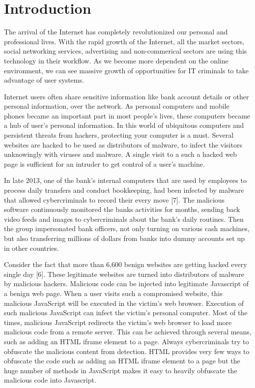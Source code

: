 \chapter{Introduction}

The arrival of the Internet has completely revolutionized our personal and professional lives. With the rapid growth of the Internet, all the market sectors, social networking services, advertising and non-commerical sectors are using this technology in their workflow. As we become more dependent on the online environment, we can see massive growth of opportunities for IT criminals to take advantage of user systems. 

Internet users often share sensitive information like bank account details or other personal information, over the network. As personal computers and mobile phones became an important part in most people's lives, these computers became a hub of user's personal information. In this world of ubiquitous computers and persistent threats from hackers, protecting your computer is a must. Several websites are hacked to be used as distributors of malware, to infect the visitors unknowingly with viruses and malware. A single visit to a such a hacked web page is sufficient for an intruder to get control of a user's machine.

In late 2013, one of the bank's internal computers that are used by employees to process daily transfers and conduct bookkeeping, had been infected by malware that allowed cybercriminals to record their every move [7]. The malicious software continuously monitored the banks activities for months, sending back video feeds and images to cybercriminals about the bank's daily routines. Then the group impersonated bank officers, not only turning on various cash machines, but also transferring millions of dollars from banks into dummy accounts set up in other countries.

Consider the fact that more than 6,600 benign websites are getting hacked every single day [6]. These legitimate websites are turned into distributors of malware by malicious hackers. Malicious code can be injected into legitimate Javascript of a benign web page. When a user visits such a compromised website, this malicious JavaScript will be executed in the victim's web browser. Execution of such malicious JavaScript can infect the victim's personal computer. Most of the times, malicious JavaScript redirects the victim's web browser to load more malicious code from a remote server. This can be achieved through several means, such as adding an HTML iframe element to a page. Always cybercriminals try to obfuscate the malicious content from detection. HTML provides very few ways to obfuscate the code such as adding an HTML iframe element to a page but the huge number of methods in JavaScript makes it easy to heavily obfuscate the malicious code into Javascript.

